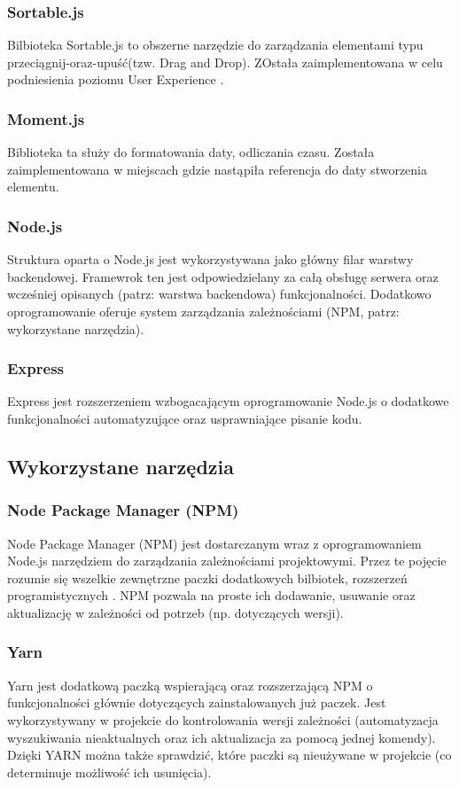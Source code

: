 \documentclass[eng,printmode]{mgr}
\begin{document}
\subsubsection{Sortable.js}
Bilbioteka Sortable.js \cite{Sortable} to obszerne narzędzie do zarządzania elementami typu przeciągnij-oraz-upuść(tzw. Drag and Drop). ZOstała zaimplementowana w celu podniesienia poziomu User Experience \cite {UX}.

\subsubsection{Moment.js}
Biblioteka ta \cite {Moment} służy do formatowania daty, odliczania czasu. Została zaimplementowana w miejscach gdzie nastąpiła referencja do daty stworzenia elementu.

\subsubsection{Node.js}
Struktura oparta o Node.js \cite {Node.js} jest wykorzystywana jako główny filar warstwy backendowej. Framewrok ten jest odpowiedzielany za całą obsługę serwera oraz wcześniej opisanych (patrz: warstwa backendowa) funkcjonalności. Dodatkowo oprogramowanie oferuje system zarządzania zależnościami (NPM, patrz: wykorzystane narzędzia).

\subsubsection{Express}
Express \cite {Express} jest rozszerzeniem wzbogacającym oprogramowanie Node.js o dodatkowe funkcjonalności automatyzujące oraz usprawniające pisanie kodu.
\subsection{Wykorzystane narzędzia}

\subsubsection{Node Package Manager (NPM)}
Node Package Manager (NPM) \cite {NPM} jest dostarczanym wraz z oprogramowaniem Node.js narzędziem do zarządzania zależnościami projektowymi. Przez te pojęcie rozumie się wszelkie zewnętrzne paczki dodatkowych bilbiotek, rozszerzeń programistycznych . NPM pozwala na proste ich dodawanie, usuwanie oraz aktualizację w zależności od potrzeb (np. dotyczących wersji).

\subsubsection{Yarn}
Yarn \cite {YARN} jest dodatkową paczką wspierającą oraz rozszerzającą NPM o funkcjonalności głównie dotyczących  zainstalowanych już paczek. Jest wykorzystywany w projekcie do kontrolowania wersji zależności (automatyzacja wyszukiwania nieaktualnych oraz ich aktualizacja za pomocą jednej komendy). Dzięki YARN można także sprawdzić, które paczki są nieużywane w projekcie (co determinuje możliwość ich usunięcia).
\end{document}
